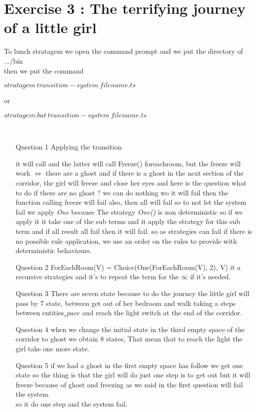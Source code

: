 \section{Exercise 3 : The terrifying journey of a little girl}
To lunch stratagem we open the command prompt and we put the directory of .../bin \\ then we put the command \\
\centerline{$stratagem\ transition-system\ filename.ts$}
or\\
\centerline{$stratagem.bat\ transition-system\ filename.ts$}
\\
\begin{enumerate}
\item[Question 1]
Applying the transition 

it will call 
and the latter will call Freeze() foreachroom, but the freeze will work $\iff$ there are a ghost and  if there is a ghost in the next section of the corridor, the girl will freeze and close her eyes and here is the question what to do if there are no ghost ? we can do nothing wo it will fail then the function calling freeze will fail also, then all will fail so to not let the system fail we apply \textit{One} because The strategy \textit{One()} is non deterministic so if we apply it it take one of the sub terms and it apply the strategy for this sub term and  if all result all fail then it will fail. so as strategies can fail if there is no possible rule application, we use an order on the rules to provide with deterministic behaviours.
\item[Question 2] ForEachRoom(V) = Choice(One(ForEachRoom(V), 2), V) it a recursive strategies and it's to repeat the term for the $\infty$ if it's needed.
\item[Question 3] There are seven state because to do the journey the little girl will pass by 7 state, between get out of her bedroom and walk taking a steps between entities$_space$ and reach the light switch at the end of the corridor.
\item[Question 4]when we change the initial state in the third empty space of the corridor to ghost we obtain 8 states, That mean that to reach the light the girl take one more state.
\item[Question 5] if we had a ghost in the first empty
space has follow  we get one state so the thing is that the girl will do just one step is to get out but it will  freeze because of ghost and freezing as we said in the first question will fail the system. \\
so it do one step and the system fail.
\end{enumerate}
